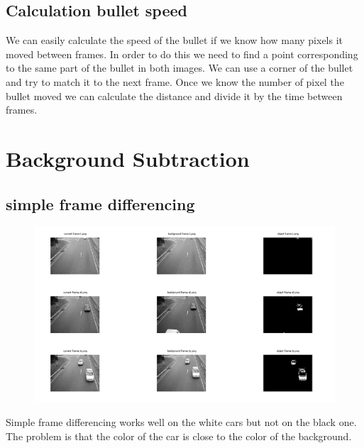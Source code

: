 \documentclass{article}
\begin{document}
	\subsection{Calculation bullet speed}
	We can easily calculate the speed of the bullet if we know how many pixels it moved between frames. In order to do this we need to find a point corresponding to the same part of the bullet in both images. We can use a corner of the bullet and try to match it to the next frame. Once we know the number of pixel the bullet moved we can calculate the distance and divide it by the time between frames.
	
	
	\section{Background Subtraction}
	
	\subsection{simple frame differencing}
	\begin{figure}[H]
		\includegraphics[width=\linewidth]{Q2/partA/partA.png}
	\end{figure}
	Simple frame differencing works well on the white cars but not on the black one.
	The problem is that the color of the car is close to the color of the background.
	\newpage
\end{document}
